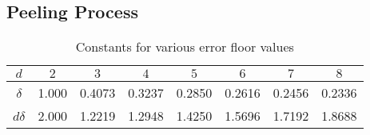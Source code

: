 \subsection{\bf Peeling Process}
\begin{table}
\centering
\begin{tabular}{| c | c | c | c | c | c | c | c | }
\hline
$d$ & $2$& $3$ & $4$ & $5$ & $6$ & $7$ & $8$ \\ \hline
$\delta$ & 1.000 & 0.4073 & 0.3237 & 0.2850 & 0.2616 & 0.2456 & 0.2336 \\ \hline
 $d\delta$ & 2.000 & 1.2219 & 1.2948 & 1.4250 & 1.5696 & 1.7192 & 1.8688 \\ \hline
\end{tabular}
\vspace{1ex}
\caption{Constants for various error floor values}
\label{Table:EtaValues}
\end{table}

